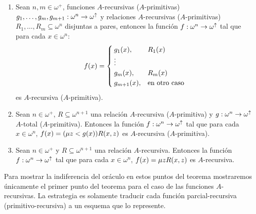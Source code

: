 \begin{theorem}
\begin{enumerate}
		\item Sean $n, m\in\omega^{+}$, funciones $A$-recursivas ($A$-primitivas) $g_{1},\dotsc, g_{m}, g_{m + 1}:\omega^{n}\to\omega^{\uparrow}$ y relaciones $A$-recursivas ($A$-primitivas) $R_{1},\dotsc, R_{m}\subseteq\omega^{n}$ disjuntas a pares, entonces la función $f:\omega^{n}\to\omega^{\uparrow}$ tal que para cada $x\in\omega^{n}$:
		\[
			f\pa*{x} =
			\begin{cases}
				g_{1}\pa*{x}, & R_{1}\pa*{x}\\
				\vdots\\
				g_{m}\pa*{x}, & R_{m}\pa*{x}\\
				g_{m + 1}\pa*{x}, &\text{en otro caso}
			\end{cases}
		\]
		es $A$-recursiva ($A$-primitiva).

		\item Sean $n\in\omega^{+}$, $R\subseteq\omega^{n + 1}$ una relación $A$-recursiva ($A$-primitiva) y $g:\omega^{n}\to\omega^{\uparrow}$ $A$-total ($A$-primitiva). Entonces la función $f:\omega^{n}\to\omega^{\uparrow}$ tal que para cada $x\in\omega^{n}$, $f\pa*{x} =\pa*{\mu z < g\pa*{x}}R\pa*{x, z}$ es $A$-recursiva ($A$-primitiva).

		\item Sean $n\in\omega^{+}$ y $R\subseteq\omega^{n + 1}$ una relación $A$-recursiva. Entonces la función $f:\omega^{n}\to\omega^{\uparrow}$ tal que para cada $x\in\omega^{n}$, $f\pa*{x} =\mu zR\pa*{x, z}$ es $A$-recursiva.
	\end{enumerate}
\end{theorem}

Para mostrar la indiferencia del oráculo en estos puntos del teorema mostraremos únicamente el primer punto del teorema para el caso de las funciones $A$-recursivas. La estrategia es solamente traducir cada función parcial-recursiva (primitivo-recursiva) a un esquema que lo represente.


